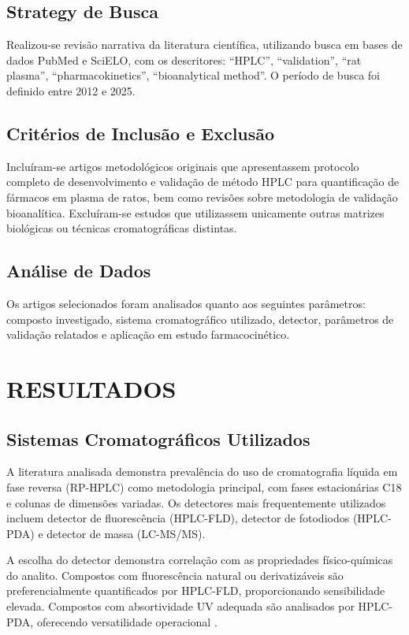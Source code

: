 \subsection{Strategy de Busca}

Realizou-se revisão narrativa da literatura científica, utilizando busca em bases de dados PubMed e SciELO, com os descritores: ``HPLC'', ``validation'', ``rat plasma'', ``pharmacokinetics'', ``bioanalytical method''. O período de busca foi definido entre 2012 e 2025.

\subsection{Critérios de Inclusão e Exclusão}

Incluíram-se artigos metodológicos originais que apresentassem protocolo completo de desenvolvimento e validação de método HPLC para quantificação de fármacos em plasma de ratos, bem como revisões sobre metodologia de validação bioanalítica. Excluíram-se estudos que utilizassem unicamente outras matrizes biológicas ou técnicas cromatográficas distintas.

\subsection{Análise de Dados}

Os artigos selecionados foram analisados quanto aos seguintes parâmetros: composto investigado, sistema cromatográfico utilizado, detector, parâmetros de validação relatados e aplicação em estudo farmacocinético.

\section{RESULTADOS}

\subsection{Sistemas Cromatográficos Utilizados}

A literatura analisada demonstra prevalência do uso de cromatografia líquida em fase reversa (RP-HPLC) como metodologia principal, com fases estacionárias C18 e colunas de dimensões variadas. Os detectores mais frequentemente utilizados incluem detector de fluorescência (HPLC-FLD), detector de fotodiodos (HPLC-PDA) e detector de massa (LC-MS/MS).

A escolha do detector demonstra correlação com as propriedades físico-químicas do analito. Compostos com fluorescência natural ou derivatizáveis são preferencialmente quantificados por HPLC-FLD, proporcionando sensibilidade elevada. Compostos com absortividade UV adequada são analisados por HPLC-PDA, oferecendo versatilidade operacional \cite{singh2023}.

